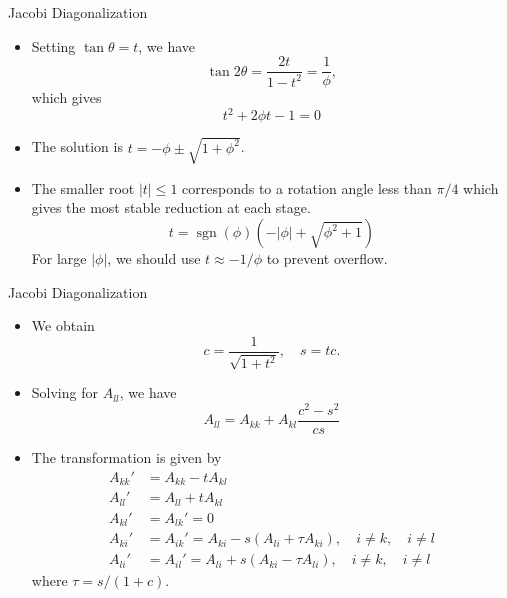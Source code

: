 \documentclass{beamer}
\begin{document}
\begin{frame}{Jacobi Diagonalization}
    \begin{itemize}
        \item Setting $\tan\theta=t$, we have
        \[
            \tan 2\theta =\frac{2t}{1-t^2}=\frac{1}{\phi}, 
        \]  which gives
        \[
            t^2+2 \phi t-1=0
\]    
\item The solution is  $t=-\phi \pm \sqrt{1+\phi^2}$.
\item The smaller root $|t|\le 1$ corresponds to a rotation angle less than $\pi/4$ 
which gives the most stable reduction at each stage.  
\[
    t=\operatorname{sgn}(\phi)\left(-|\phi|+\sqrt{\phi^2+1}\right)
\]
For large $|\phi|$, we should use $t\approx -1/\phi$ to prevent overflow.
    \end{itemize}

\end{frame}

\begin{frame}{Jacobi Diagonalization}
    \begin{itemize}
        \item We obtain 
        \[  
        c=\frac{1}{\sqrt{1+t^2}}, \quad s=tc.
        \]
        \item Solving for $A_{ll}$, we have
        \[
            A_{l l}=A_{k k}+A_{k l} \frac{c^2-s^2}{c s}
        \]
        \item The transformation is given by 
        \begin{align*}
            A_{k k}' & =A_{k k}-t A_{k l} \\
            A_{l l}' & =A_{l l}+t A_{k l} \\
            A_{k l}' & =A_{l k}'=0 \\
            A_{k i}' & =A_{i k}'=A_{k i}-s\left(A_{l i}+\tau A_{k i}\right), \quad i \neq k, \quad i \neq l \\
            A_{l i}' & =A_{i l}'=A_{l i}+s\left(A_{k i}-\tau A_{l i}\right), \quad i \neq k, \quad i \neq l
        \end{align*}
        where $\tau=s/(1+c) $.
    \end{itemize}
\end{frame}
\end{document}
